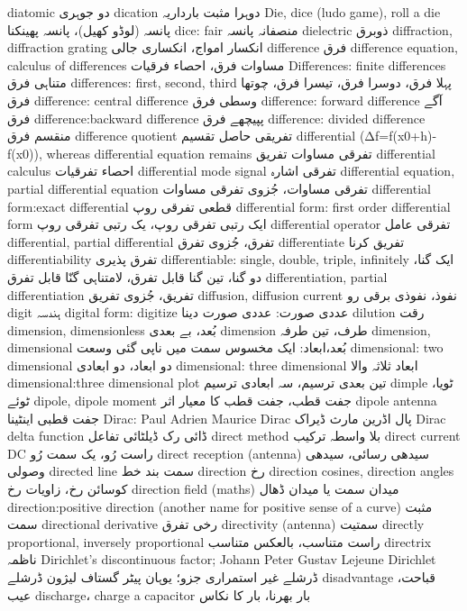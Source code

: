 diatomic	دو جوہری
dication	دوہرا مثبت بارداریہ
Die, dice (ludo game), roll a die	پانسہ (لوڈو کھیل)، پانسہ پھینکنا
dice: fair	منصفانہ پانسہ
dielectric	ذوبرق
diffraction, diffraction grating	انکسار امواج، انکساری جالی
difference	فرق
difference equation, calculus of differences	مساوات فرق، احصاء فرقیات
Differences: finite differences	متناہی فرق
differences: first, second, third	پہلا فرق، دوسرا فرق، تیسرا فرق، چوتھا فرق
difference: central difference	وسطی فرق
difference: forward difference	آگے فرق
difference:backward difference	پپیچھے فرق
difference: divided difference	منقسم فرق
difference quotient	تفریقی حاصل تقسیم
differential  (Δf=f(x0+h)-f(x0)), whereas differential equation remains    تفرقی مساوات	تفریق
differential calculus	احصاء تفرقیات
differential mode signal	تفرقی اشارہ
differential equation, partial differential equation	تفرقی مساوات، جُزوی تفرقی مساوات
differential form:exact differential	قطعی تفرقی روپ
differential form: first order differential form	ایک رتبی تفرقی روپ، یک رتبی تفرقی روپ
differential operator	تفرقی عامل
differential, partial differential	تفرق، جُزوی تفرق
differentiate	تفریق کرنا
differentiability	تفرق پذیری
differentiable: single, double, triple, infinitely	ایک گنا، دو گنا، تین گنا قابل تفرق، لامتناہی گنّا قابل تفرق
differentiation, partial differentiation	تفریق، جُزوی تفریق
diffusion, diffusion current	نفوذ، نفوذی برقی رو
digit	ہندسہ
digital form: digitize	عددی صورت: عددی صورت دینا
dilution	رقت
dimension, dimensionless	بُعد، بے بعدی
dimension	طرف، تین طرفہ
dimension, dimensional	بُعد،ابعاد: ایک مخسوس سمت میں ناپی گئی وسعت
dimensional: two dimensional	دو ابعاد، دو ابعادی
dimensional: three dimensional	ابعاد ثلاثہ والا
dimensional:three dimensional plot	تین بعدی ترسیم، سہ ابعادی ترسیم
dimple	ٹویا، ٹوئے
dipole, dipole moment	جفت قطب، جفت قطب کا معیار اثر
dipole antenna	جفت قطبی اینٹینا
Dirac: Paul Adrien Maurice Dirac	پال اڈرین مارث ڈیراک
Dirac delta function	ڈائی رک ڈیلٹائی تفاعل
direct method	بلا واسطہ ترکیب
direct current  DC	راست رُو، یک سمت رُو
direct reception (antenna)	سیدھی رسائی، سیدھی وصولی
directed line	سمت بند خط
direction	رخ
direction cosines, direction angles	کوسائن رخ، زاویات رخ
direction field (maths)	میدان سمت یا میدان ڈھال
direction:positive direction (another name for positive sense of a curve)	مثبت سمت
directional derivative	رخی تفرق
directivity (antenna)	سمتیت
directly proportional, inversely proportional	راست متناسب، بالعکس متناسب
directrix	ناظمہ
Dirichlet's discontinuous factor; Johann Peter Gustav Lejeune Dirichlet	ڈرشلے غیر استمراری جزو؛ یوہان پیٹر گستاف لیژون ڈرشلے
disadvantage	قباحت، عیب
discharge، charge a capacitor	بار بھرنا، بار کا نکاس
